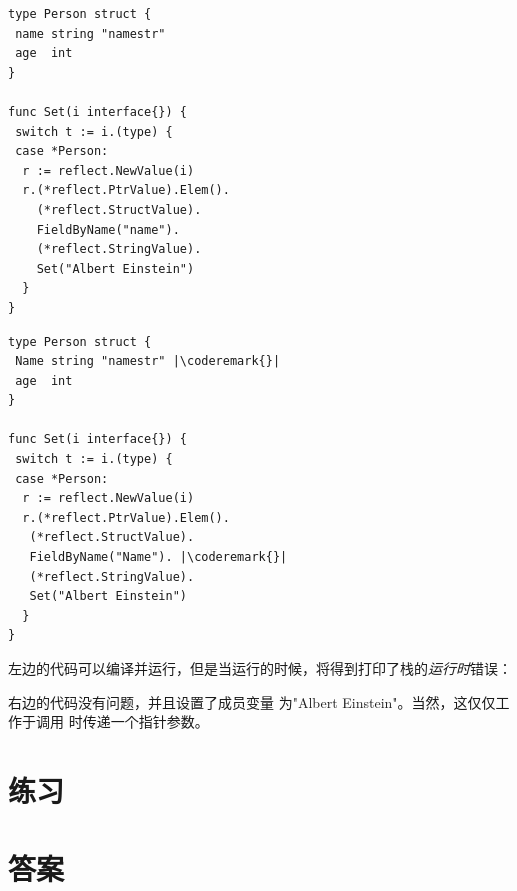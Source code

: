 \begin{minipage}{.5\textwidth}
\begin{lstlisting}[caption=私有成员的反射]
type Person struct {
 name string "namestr"
 age  int
}

func Set(i interface{}) {
 switch t := i.(type) {
 case *Person:
  r := reflect.NewValue(i)
  r.(*reflect.PtrValue).Elem().
    (*reflect.StructValue).
    FieldByName("name").
    (*reflect.StringValue).
    Set("Albert Einstein")
  }
}
\end{lstlisting}
\end{minipage}
\hspace{2em}
\begin{minipage}{.5\textwidth}
\begin{lstlisting}[caption=公有成员的反射]
type Person struct {
 Name string "namestr" |\coderemark{}|
 age  int
}

func Set(i interface{}) {
 switch t := i.(type) {
 case *Person:
  r := reflect.NewValue(i)
  r.(*reflect.PtrValue).Elem().
   (*reflect.StructValue).
   FieldByName("Name"). |\coderemark{}|
   (*reflect.StringValue).
   Set("Albert Einstein")
  }
}
\end{lstlisting}
\end{minipage}
左边的代码可以编译并运行，但是当运行的时候，将得到打印了栈的\emph{运行时}错误：

\noindent{}

\noindent{}右边的代码没有问题，并且设置了成员变量  
为"Albert Einstein"。当然，这仅仅工作于调用  时传递一个指针参数。

\section{练习}






\cleardoublepage
\section{答案}
\shipoutAnswer
